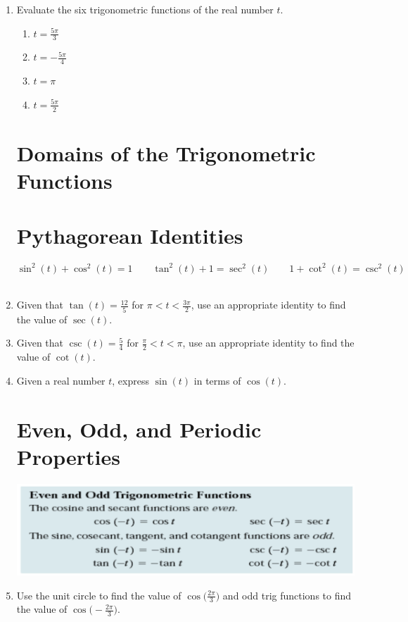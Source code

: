 \documentclass[11pt]{article}
\begin{document}
\begin{enumerate}
\item Evaluate the six trigonometric functions of the real number $t$.
\begin{enumerate}
\item $\displaystyle t=\frac{5\pi}{3}$
\newpage
\item $\displaystyle t=-\frac{5\pi}{4}$\vfill
\item $\displaystyle t=\pi$\vfill
\item $\displaystyle t=\frac{5\pi}{2}$\vfill
\end{enumerate}


\newpage

\section{Domains of the Trigonometric Functions}
\newpage

\section{Pythagorean Identities}
$$\sin^2(t)+\cos^2(t)=1 \quad \quad \tan^2(t)+1=\sec^2(t) \quad \quad 1+\cot^2(t)=\csc^2(t)$$
\\

\item Given that $\tan(t)=\frac{12}{5}$ for $\pi < t < \frac{3\pi}{2}$, use an appropriate identity to find the value of $\sec(t)$.\\[2in]

\item Given that $\csc(t)=\frac{5}{4}$ for $\frac{\pi}{2} < t < \pi$, use an appropriate identity to find the value of $\cot(t)$.\\[2in]

\item Given a real number $t$, express $\sin(t)$ in terms of $\cos(t)$.\\[1.5in]

\newpage

\section{Even, Odd, and Periodic Properties}
\includegraphics[scale=.6]{evenodd}\\
\item Use the unit circle to find the value of $\displaystyle \cos \Bigg(\frac{2\pi}{3}\Bigg)$ and odd trig functions to find the value of $\displaystyle \cos \Bigg(-\frac{2\pi}{3}\Bigg)$.


\end{enumerate}
\end{document}
